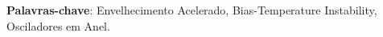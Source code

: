 %	
%   
%	
	
	
	
	
  

    



\begin{resumo}[Resumo]

    \vspace{\onelineskip}
	\noindent
        
	\textbf{Palavras-chave}: Envelhecimento Acelerado, Bias-Temperature Instability, Osciladores em Anel.

\end{resumo}

